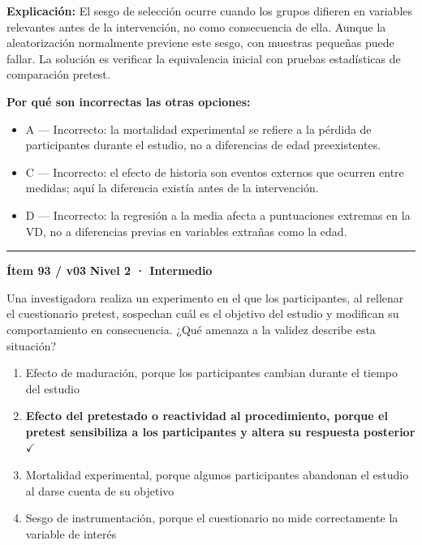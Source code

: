 \documentclass[12pt,a4paper]{article}
\begin{document}
\noindent\textbf{\color{azul}Explicación:} El sesgo de selección ocurre cuando los grupos difieren en variables relevantes antes de la intervención, no como consecuencia de ella. Aunque la aleatorización normalmente previene este sesgo, con muestras pequeñas puede fallar. La solución es verificar la equivalencia inicial con pruebas estadísticas de comparación pretest.

\noindent\textbf{\color{gris}Por qué son incorrectas las otras opciones:}
\begin{itemize}
  \item {\small A — Incorrecto: la mortalidad experimental se refiere a la pérdida de participantes durante el estudio, no a diferencias de edad preexistentes.}
  \item {\small C — Incorrecto: el efecto de historia son eventos externos que ocurren entre medidas; aquí la diferencia existía antes de la intervención.}
  \item {\small D — Incorrecto: la regresión a la media afecta a puntuaciones extremas en la VD, no a diferencias previas en variables extrañas como la edad.}
\end{itemize}
\vspace{8pt}\hrule\vspace{10pt}

\begin{mdframed}[backgroundcolor=fondogris,linecolor=ambar,linewidth=1pt,innerleftmargin=10pt,innerrightmargin=10pt,innertopmargin=7pt,innerbottommargin=7pt]
\textbf{Ítem 93 / v03} \hfill {\small\bfseries\color{ambar} Nivel 2 · Intermedio}
\end{mdframed}

Una investigadora realiza un experimento en el que los participantes, al rellenar el cuestionario pretest, sospechan cuál es el objetivo del estudio y modifican su comportamiento en consecuencia. ¿Qué amenaza a la validez describe esta situación?

\begin{enumerate}
  \item[A.] Efecto de maduración, porque los participantes cambian durante el tiempo del estudio
  \item[\textbf{\color{verde}B.}] \textbf{\color{verde} Efecto del pretestado o reactividad al procedimiento, porque el pretest sensibiliza a los participantes y altera su respuesta posterior} \hfill $\checkmark$
  \item[C.] Mortalidad experimental, porque algunos participantes abandonan el estudio al darse cuenta de su objetivo
  \item[D.] Sesgo de instrumentación, porque el cuestionario no mide correctamente la variable de interés
\end{enumerate}
\end{document}
